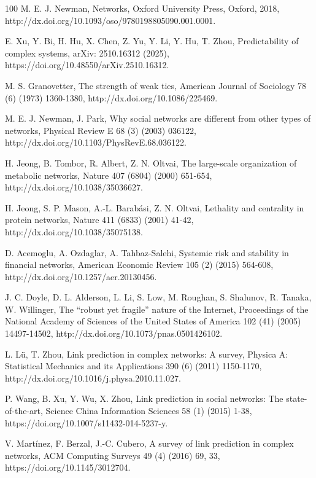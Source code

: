 \documentclass{article}
\begin{document}
\begin{thebibliography}{100}
	M. E. J. Newman, Networks, Oxford University Press, Oxford, 2018, http://dx.doi.org/10.1093/oso/9780198805090.001.0001.
	
	E. Xu, Y. Bi, H. Hu, X. Chen, Z. Yu, Y. Li, Y. Hu, T. Zhou, Predictability of complex systems, arXiv: 2510.16312 (2025), https://doi.org/10.48550/arXiv.2510.16312.
	
	M. S. Granovetter, The strength of weak ties, American Journal of Sociology 78 (6) (1973) 1360-1380, http://dx.doi.org/10.1086/225469.
	
	M. E. J. Newman, J. Park, Why social networks are different from other types of networks, Physical Review E 68 (3) (2003) 036122, http://dx.doi.org/10.1103/PhysRevE.68.036122.
	
	H. Jeong, B. Tombor, R. Albert, Z. N. Oltvai, The large-scale organization of metabolic networks, Nature 407 (6804) (2000) 651-654, http://dx.doi.org/10.1038/35036627.
	
	H. Jeong, S. P. Mason, A.-L. Barabási, Z. N. Oltvai, Lethality and centrality in protein networks, Nature 411 (6833) (2001) 41-42, http://dx.doi.org/10.1038/35075138.
	
	D. Acemoglu, A. Ozdaglar, A. Tahbaz-Salehi, Systemic risk and stability in financial networks, American Economic Review 105 (2) (2015) 564-608, http://dx.doi.org/10.1257/aer.20130456.
	
	J. C. Doyle, D. L. Alderson, L. Li, S. Low, M. Roughan, S. Shalunov, R. Tanaka, W. Willinger, The “robust yet fragile” nature of the Internet, Proceedings of the National Academy of Sciences of the United States of America 102 (41) (2005) 14497-14502, http://dx.doi.org/10.1073/pnas.0501426102.
	
	L. Lü, T. Zhou, Link prediction in complex networks: A survey, Physica A: Statistical Mechanics and its Applications 390 (6) (2011) 1150-1170, http://dx.doi.org/10.1016/j.physa.2010.11.027.
	
	P. Wang, B. Xu, Y. Wu, X. Zhou, Link prediction in social networks: The state-of-the-art, Science China Information Sciences 58 (1) (2015) 1-38, https://doi.org/10.1007/s11432-014-5237-y.
	
	V. Martínez, F. Berzal, J.-C. Cubero, A survey of link prediction in complex networks, ACM Computing Surveys 49 (4) (2016) 69, 33, https://doi.org/10.1145/3012704.
	

\end{thebibliography}
\end{document}
